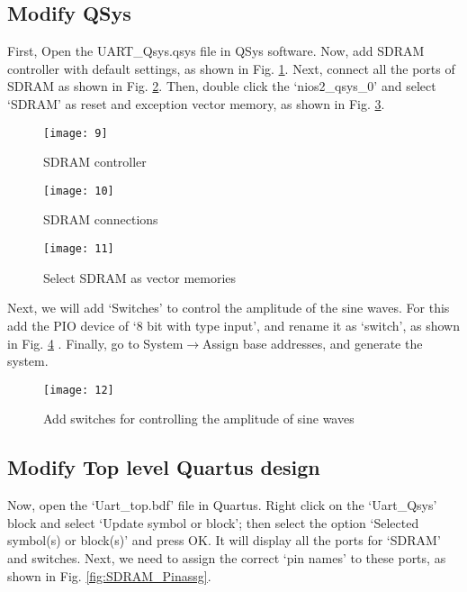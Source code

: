 \subsection{Modify QSys}
First, Open the UART\_Qsys.qsys file in QSys software. Now, add SDRAM controller with default settings,  as shown in Fig. \ref{fig:sdram_con}. Next, connect all the ports of SDRAM as shown in Fig. \ref{fig:sdram_connections}. Then, double click the `nios2\_qsys\_0' and select `SDRAM' as reset and exception vector memory, as shown in Fig. \ref{fig:sdram_vector_memory}. 

\begin{figure}[!h]
	\centering
	\texttt{[image: 9]}
	\caption{SDRAM controller}
	\label{fig:sdram_con}
\end{figure}


\begin{figure}[!h]
	\centering
	\texttt{[image: 10]}
	\caption{SDRAM connections}
	\label{fig:sdram_connections}
\end{figure}


\begin{figure}[!h]
	\centering
	\texttt{[image: 11]}
	\caption{Select SDRAM as vector memories}
	\label{fig:sdram_vector_memory}
\end{figure}


Next, we will add `Switches' to control the amplitude of the sine waves. For this add the PIO device of `8 bit with type input', and rename it as `switch', as shown in Fig. \ref{fig:switchForAmplitude} . Finally, go to System$\rightarrow$Assign base addresses, and generate the system. 

\begin{figure}[!h]
	\centering
	\texttt{[image: 12]}
	\caption{Add switches for controlling the amplitude of sine waves}
	\label{fig:switchForAmplitude}
\end{figure}


\subsection{Modify Top level Quartus design}
Now, open the `Uart\_top.bdf' file in Quartus. Right click on the `Uart\_Qsys' block and select `Update symbol or block'; then select the option `Selected symbol(s) or block(s)' and press OK. It will display all the ports for `SDRAM' and switches. Next, we need to assign the correct `pin names' to these ports, as shown in Fig. \ref{fig:SDRAM_Pinassg}.  

